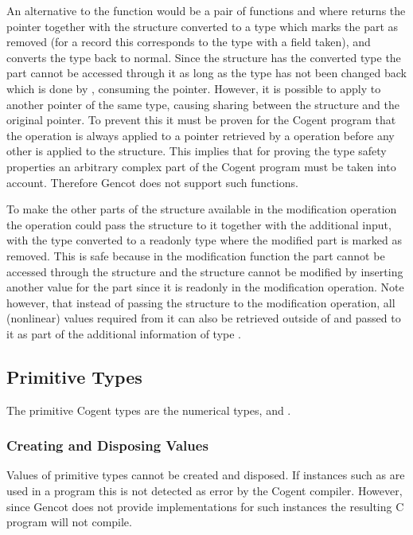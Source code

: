 An alternative to the function  would be a pair of functions  and  where 
returns the pointer together with the structure converted to a type which marks the part as removed (for a record this
corresponds to the type with a field taken), and  converts the type back to normal. 
Since the structure has the converted type the part cannot be accessed through it
as long as the type has not been changed back which is done by , consuming the pointer.
However, it is possible to apply  to another pointer of the same type, causing sharing between the 
structure and the original pointer. To prevent this it must be proven for the Cogent program that the 
operation is always applied to a pointer retrieved by a  operation before any other 
is applied to the structure. This implies that
for proving the type safety properties an arbitrary complex part of the Cogent program must be taken into
account. Therefore Gencot does not support such functions.

To make the other parts of the structure available in the modification operation the  operation could
pass the structure to it together with the additional input, with the type converted to a readonly type where the modified
part is marked as removed. This is safe because in the modification function the part cannot be accessed
through the structure and the structure cannot be modified by inserting another value for the part since it is
readonly in the modification operation. Note however, that instead of passing the structure to the modification operation,
all (nonlinear) values required from it can also be retrieved outside of  and passed to it as part of the 
additional information of type .

\subsection{Primitive Types}
\label{design-operations-prim}

The primitive Cogent types are the numerical types,  and . 

\subsubsection{Creating and Disposing Values}

Values of primitive types cannot be created and disposed. If instances such as  are used in a program 
this is not detected as error by the Cogent compiler. However, since Gencot does not provide implementations for such
instances the resulting C program will not compile.

